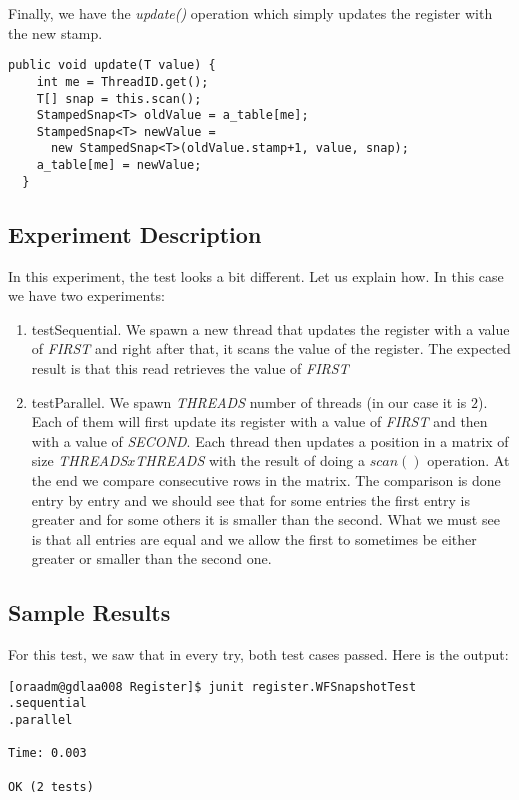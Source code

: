 \hfill
\par
Finally, we have the \textit{update()} operation which simply updates the
register with the new stamp.
\par
\hfill
\begin{lstlisting}[style=numbers]
  public void update(T value) {
    int me = ThreadID.get();
    T[] snap = this.scan();
    StampedSnap<T> oldValue = a_table[me];
    StampedSnap<T> newValue =
      new StampedSnap<T>(oldValue.stamp+1, value, snap);
    a_table[me] = newValue;
  }
\end{lstlisting}
\hfill
\subsection{Experiment Description}
\par
In this experiment, the test looks a bit different. Let us explain how. In this
case we have two experiments:
\par
\begin{enumerate}
\item testSequential. We spawn a new thread that updates the register with a
value of \textit{FIRST} and right after that, it scans the value of the
register. The expected result is that this read retrieves the value of
\textit{FIRST}
\item testParallel. We spawn \textit{THREADS} number of threads (in our case it
is $2$). Each of them will first update its register with a value of
\textit{FIRST} and then with a value of \textit{SECOND}. Each thread then
updates a position in a matrix of size \textit{THREADS}$x$\textit{THREADS} with
the result of doing a $scan()$ operation. At the end we compare consecutive rows
in the matrix. The comparison is done entry by entry and we should see that for
some entries the first entry is greater and for some others it is smaller than
the second. What we must see is that all entries are equal and we allow the
first to sometimes be either greater or smaller than the second one.
\end{enumerate}
\subsection{Sample Results}
\par
For this test, we saw that in every try, both test cases passed. Here is the
output:
\par
\begin{verbatim}
[oraadm@gdlaa008 Register]$ junit register.WFSnapshotTest
.sequential
.parallel

Time: 0.003

OK (2 tests)
\end{verbatim}
\par
